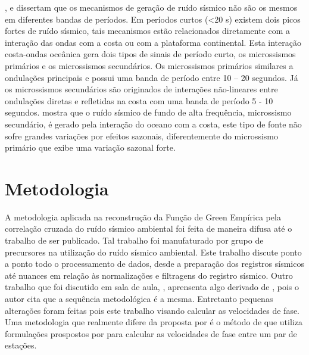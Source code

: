 \documentclass[paper,twocolumn]{geophysics}
\begin{document}
\cite{schulte-pelkum_strong_2004}, \cite{kedar_oceans_2005} e \cite{stehly_study_2006} dissertam que os mecanismos de geração de ruído sísmico não são os mesmos em diferentes bandas de períodos. Em períodos curtos (<20 s) existem dois picos fortes de ruído sísmico, tais mecanismos estão relacionados diretamente com a interação das ondas com a costa ou com a plataforma continental. Esta interação costa-ondas oceânica gera dois tipos de sinais de período curto, os microssismos primários e os microssismos secundários.  Os microssismos primários similares a ondulações principais e possui uma banda de período entre 10 – 20 segundos. Já os microssismos secundários são originados de interações não-lineares entre ondulações diretas e refletidas na costa com uma banda de período 5 - 10 segundos. \cite{stehly_study_2006} mostra que o ruído sísmico de fundo de alta frequência, microssismo secundário, é gerado pela interação do oceano com a costa, este tipo de fonte não sofre grandes variações por efeitos sazonais, diferentemente do microssismo primário que exibe uma variação sazonal forte.


\section*{Metodologia}

A metodologia aplicada na reconstrução da Função de Green Empírica pela correlação cruzada do ruído sísmico ambiental foi feita de maneira difusa até o trabalho de \cite{bensen_processing_2007} ser publicado. Tal trabalho foi manufaturado por grupo de precursores na utilização do ruído sísmico ambiental. Este trabalho discute ponto a ponto todo o processamento de dados, desde a preparação dos registros sísmicos até nuances em relação às normalizações e filtragens do registro sísmico. Outro trabalho que foi discutido em sala de aula, \cite{lin_surface_2008}, aprensenta algo derivado de \cite{bensen_processing_2007}, pois o autor cita que a sequência metodológica é a mesma. Entretanto pequenas alterações foram feitas pois este trabalho visando calcular as velocidades de fase. Uma metodologia que realmente difere da proposta por \cite{bensen_processing_2007} é o método de \cite{ekstrom_determination_2009} que utiliza formulações prospostos por \cite{aki_space_1957} para calcular as velocidades de fase entre um par de estações.
\end{document}
